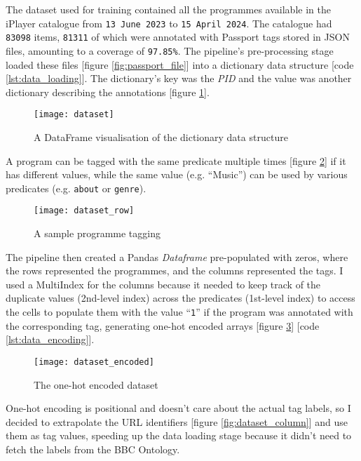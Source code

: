 
The dataset used for training contained all the programmes available in the iPlayer catalogue from \verb|13 June 2023| to \verb|15 April 2024|.
The catalogue had \verb|83098| items, \verb|81311| of which were annotated with Passport tags stored in JSON files, amounting to a coverage of \verb|97.85%|.
The pipeline's pre-processing stage loaded these files [figure \ref{fig:passport_file}] into a dictionary data structure [code \ref{lst:data_loading}].
The dictionary's key was the \textit{PID} and the value was another dictionary describing the annotations [figure \ref{fig:dataset}].

\begin{figure}[h]
  \centering
  \texttt{[image: dataset]}
  \caption{A DataFrame visualisation of the dictionary data structure}
  \label{fig:dataset}
\end{figure}

A program can be tagged with the same predicate multiple times [figure \ref{fig:dataset_row}] if it has different values,
while the same value (e.g. ``Music'') can be used by various predicates (e.g. \verb|about| or \verb|genre|).

\begin{figure}[h]
  \centering
  \texttt{[image: dataset\_row]}
  \caption{A sample programme tagging}
  \label{fig:dataset_row}
\end{figure}

The pipeline then created a Pandas \textit{Dataframe} pre-populated with zeros,
where the rows represented the programmes, and the columns represented the tags.
I used a MultiIndex \cite{Pandas:MultiIndex} for the columns because it needed to keep track of the duplicate values (2nd-level index)
across the predicates (1st-level index) to access the cells to populate them with the value ``\verb|1|''
if the program was annotated with the corresponding tag, generating one-hot encoded arrays [figure \ref{fig:dataset_encoded}] [code \ref{lst:data_encoding}].

\begin{figure}[h]
  \centering
  \texttt{[image: dataset\_encoded]}
  \caption{The one-hot encoded dataset}
  \label{fig:dataset_encoded}
\end{figure}

One-hot encoding is positional and doesn't care about the actual tag labels,
so I decided to extrapolate the URL identifiers [figure \ref{fig:dataset_column}] and use them as tag values,
speeding up the data loading stage because it didn't need to fetch the labels from the BBC Ontology.

